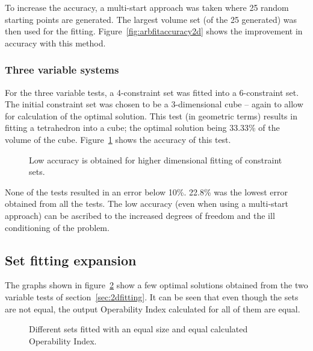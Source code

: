 To increase the accuracy, a multi-start approach was taken where 25 random starting points are generated.
The largest volume set (of the 25 generated) was then used for the fitting.
Figure~\ref{fig:arbfitaccuracy2d} shows the improvement in accuracy with this method.

\subsubsection{Three variable systems}
For the three variable tests, a 4-constraint set was fitted into a 6-constraint set.
The initial constraint set was chosen to be a 3-dimensional cube -- again to allow for calculation of the optimal solution.
This test (in geometric terms) results in fitting a tetrahedron into a cube; the optimal solution being 33.33\% of the volume of the cube.
Figure~\ref{fig:arbfitaccuracy3d} shows the accuracy of this test.

\begin{figure}[htbp]
  \centering
    \scalebox{1}{}
  \caption[Accuracy of constraint set fitting for 3 variables]{Low accuracy is obtained for higher dimensional fitting of constraint sets.}
  \label{fig:arbfitaccuracy3d}
\end{figure}

None of the tests resulted in an error below 10\%.
22.8\% was the lowest error obtained from all the tests.
The low accuracy (even when using a multi-start approach) can be ascribed to the increased degrees of freedom and the ill conditioning of the problem.

\subsection{Set fitting expansion}\label{sec:setfitfuture}
The graphs shown in figure~\ref{fig:equaloifits} show a few optimal solutions obtained from the two variable tests of section~\ref{sec:2dfitting}.
It can be seen that even though the sets are not equal, the output Operability Index \citep{vinsonphd} calculated for all of them are equal.
\begin{figure}[htbp]
  \centering
    \scalebox{1}{}
    \scalebox{1}{}
  \caption[Equal size constraint set fits]{Different sets fitted with an equal size and equal calculated Operability Index.}
  \label{fig:equaloifits}
\end{figure}

